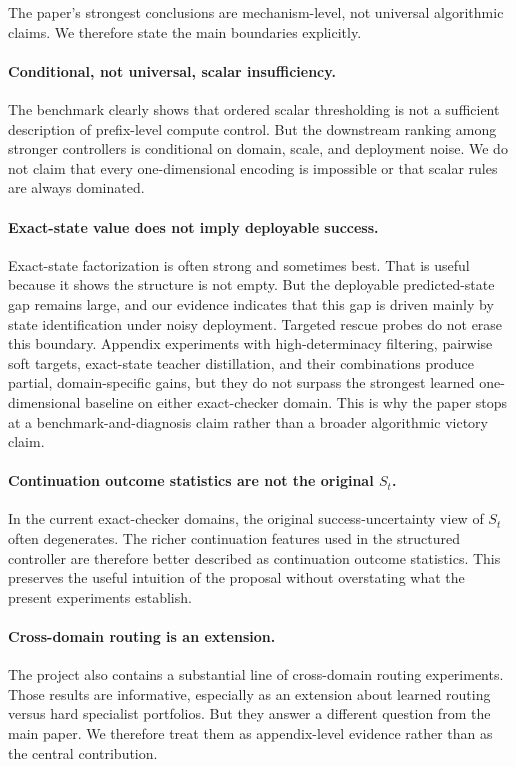 The paper's strongest conclusions are mechanism-level, not universal algorithmic claims.
We therefore state the main boundaries explicitly.

\paragraph{Conditional, not universal, scalar insufficiency.}
The benchmark clearly shows that ordered scalar thresholding is not a sufficient description of prefix-level compute control.
But the downstream ranking among stronger controllers is conditional on domain, scale, and deployment noise.
We do not claim that every one-dimensional encoding is impossible or that scalar rules are always dominated.

\paragraph{Exact-state value does not imply deployable success.}
Exact-state factorization is often strong and sometimes best.
That is useful because it shows the structure is not empty.
But the deployable predicted-state gap remains large, and our evidence indicates that this gap is driven mainly by state identification under noisy deployment.
Targeted rescue probes do not erase this boundary.
Appendix experiments with high-determinacy filtering, pairwise soft targets, exact-state teacher distillation, and their combinations produce partial, domain-specific gains, but they do not surpass the strongest learned one-dimensional baseline on either exact-checker domain.
This is why the paper stops at a benchmark-and-diagnosis claim rather than a broader algorithmic victory claim.

\paragraph{Continuation outcome statistics are not the original \(S_t\).}
In the current exact-checker domains, the original success-uncertainty view of \(S_t\) often degenerates.
The richer continuation features used in the structured controller are therefore better described as continuation outcome statistics.
This preserves the useful intuition of the proposal without overstating what the present experiments establish.

\paragraph{Cross-domain routing is an extension.}
The project also contains a substantial line of cross-domain routing experiments.
Those results are informative, especially as an extension about learned routing versus hard specialist portfolios.
But they answer a different question from the main paper.
We therefore treat them as appendix-level evidence rather than as the central contribution.

